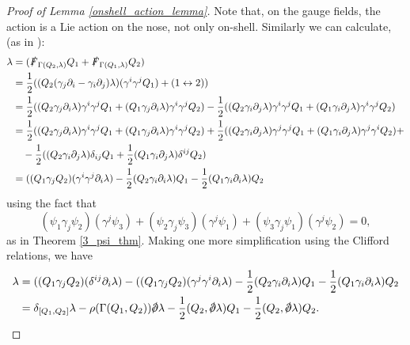 \documentclass[10pt, oneside]{article}
\begin{document}
\begin{proof}[Proof of Lemma \ref{onshell_action_lemma}]
Note that, on the gauge fields, the action is a Lie action on the nose, not only on-shell.  Similarly we can calculate, (as in \cite{Guillen}):
\begin{align*}
[\delta_{Q_1}, \delta_{Q_2}] \lambda &= (\sd F_{\Gamma(Q_2, \lambda)} Q_1 + \sd F_{\Gamma(Q_1,\lambda)} Q_2) \\
&= \frac 12((Q_2 (\gamma_j \dd_i - \gamma_i \dd_j) \lambda) (\gamma^i \gamma^j Q_1) + (1 \leftrightarrow 2)) \\
&= \frac 12((Q_2 \gamma_j \dd_i \lambda) \gamma^i \gamma^j Q_1 + (Q_1 \gamma_j \dd_i \lambda) \gamma^i \gamma^j Q_2) - \frac 12((Q_2 \gamma_i \dd_j \lambda) \gamma^i \gamma^j Q_1 + (Q_1 \gamma_i \dd_j \lambda) \gamma^i \gamma^j Q_2) \\
&= \frac 12((Q_2 \gamma_j \dd_i \lambda) \gamma^i \gamma^j Q_1 + (Q_1 \gamma_j \dd_i \lambda) \gamma^i \gamma^j Q_2) + \frac 12((Q_2 \gamma_i \dd_j \lambda) \gamma^j \gamma^j Q_1 + (Q_1 \gamma_i \dd_j \lambda) \gamma^j \gamma^i Q_2) + \\
&\quad - \frac 12((Q_2 \gamma_i \dd_j \lambda) \delta_{ij} Q_1 + \frac 12(Q_1 \gamma_i \dd_j \lambda) \delta^{ij} Q_2) \\
&= ((Q_1 \gamma_j Q_2) (\gamma^i \gamma^j \dd_i \lambda) - \frac 12(Q_2 \gamma_i \dd_i \lambda)Q_1 - \frac 12(Q_1 \gamma_i \dd_i \lambda)Q_2
\end{align*}
using the fact that 
\[(\psi_1 \gamma_j \psi_2)(\gamma^j \psi_3) + (\psi_2 \gamma_j \psi_3)(\gamma^j \psi_1) + (\psi_3 \gamma_j \psi_1)(\gamma^j \psi_2) = 0,\]
as in Theorem \ref{3_psi_thm}.  Making one more simplification using the Clifford relations, we have
\begin{align*}
[\delta_{Q_1}, \delta_{Q_2}] \lambda &= ((Q_1 \gamma_j Q_2) (\delta^{ij} \dd_i \lambda) - ((Q_1 \gamma_j Q_2) (\gamma^j \gamma^i \dd_i \lambda) - \frac 12(Q_2 \gamma_i \dd_i \lambda)Q_1 - \frac 12(Q_1 \gamma_i \dd_i \lambda)Q_2 \\
&= \delta_{[Q_1,Q_2]} \lambda - \rho(\Gamma(Q_1,Q_2)) \sd \dd \lambda - \frac 12(Q_2, \sd \dd \lambda)Q_1 - \frac 12(Q_2, \sd \dd \lambda)Q_2.
\end{align*}
\end{proof}
\end{document}
